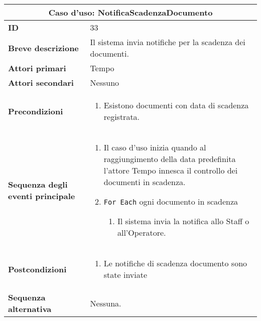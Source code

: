 \documentclass[a4paper]{report}
\begin{document}
\clearpage
\begin{table}[H]
\vspace*{-0cm}
\renewcommand{\arraystretch}{1.9}
\begin{tabular}{|p{3.9cm}|p{9.9cm}|}
\hline
\multicolumn{2}{|c|}{\textbf{Caso d’uso: NotificaScadenzaDocumento}} \\ \hline
	\textbf{ID} & 33 \\ \hline
	\textbf{Breve descrizione} & Il sistema invia notifiche per la scadenza dei documenti. \\ \hline
	\textbf{Attori primari} & Tempo \\ \hline
	\textbf{Attori secondari} & Nessuno \\ \hline
	\textbf{Precondizioni} & \begin{enumerate}[leftmargin=14pt,label=\arabic*.,labelsep=0.5em,topsep=0pt,partopsep=0pt,parsep=0pt,itemsep=0pt]
        \item Esistono documenti con data di scadenza registrata.
    \end{enumerate} \\ \hline
	\textbf{Sequenza degli eventi principale} & 
\begin{enumerate}[leftmargin=14pt,label=\arabic*.,labelsep=0.5em,topsep=0pt,partopsep=0pt,parsep=0pt,itemsep=0pt]
    \item Il caso d’uso inizia quando al raggiungimento della data predefinita l’attore Tempo innesca il controllo dei documenti in scadenza.
    \item \texttt{For Each} ogni documento in scadenza
    \begin{enumerate}[label=\arabic{enumi}.\arabic*.,leftmargin=22pt,labelsep=0.5em,topsep=0pt,partopsep=0pt,parsep=0pt,itemsep=0pt]
        \item Il sistema invia la notifica allo Staff o all’Operatore.
    \end{enumerate}
\end{enumerate}\\ \hline
	\textbf{Postcondizioni} & \begin{enumerate}[label=\arabic*.,leftmargin=14pt,labelsep=0.5em,topsep=0pt,partopsep=0pt,parsep=0pt,itemsep=0pt]
        \item Le notifiche di scadenza documento sono state inviate
    \end{enumerate} \\ \hline
	\textbf{Sequenza alternativa} & Nessuna. \\ \hline
\end{tabular}
\end{table}
\end{document}
